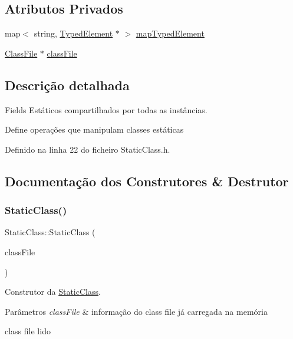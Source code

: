 \subsection*{Atributos Privados}
\begin{DoxyCompactItemize}
\item 
map$<$ string, \hyperlink{BasicTypes_8h_a97b332303b1262282599e6ede0637b82}{Typed\+Element} $\ast$ $>$ \hyperlink{classStaticClass_a472067db1f02a84897348f6a2ca68636}{map\+Typed\+Element}
\item 
\hyperlink{classClassFile}{Class\+File} $\ast$ \hyperlink{classStaticClass_a809f1e4dabb3db229a18423f0d0b4a95}{class\+File}
\end{DoxyCompactItemize}


\subsection{Descrição detalhada}
Fields Estáticos compartilhados por todas as instâncias. 

Define operações que manipulam classes estáticas 

Definido na linha 22 do ficheiro Static\+Class.\+h.



\subsection{Documentação dos Construtores \& Destrutor}
\mbox{\label{classStaticClass_a6c0e4d8842888a97160f1e815c8e6ac3}} 
\subsubsection{\texorpdfstring{Static\+Class()}{StaticClass()}}
{\footnotesize\ttfamily Static\+Class\+::\+Static\+Class (\begin{DoxyParamCaption}\item[{\hyperlink{classClassFile}{Class\+File} $\ast$}]{class\+File }\end{DoxyParamCaption})}



Construtor da \hyperlink{classStaticClass}{Static\+Class}. 


\begin{DoxyParams}{Parâmetros}
{\em class\+File} & informação do class file já carregada na memória \\
\hline
\end{DoxyParams}
class file lido

